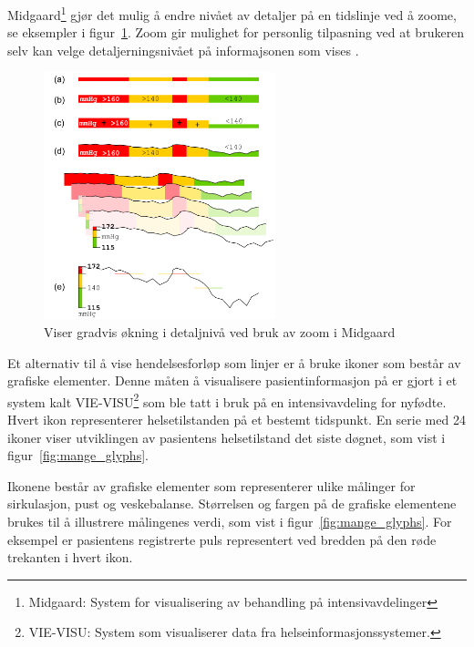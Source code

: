 Midgaard\footnote{Midgaard: System for visualisering av behandling på intensivavdelinger} gjør det mulig å endre nivået av detaljer på en tidslinje ved å zoome, se eksempler i figur~\ref{fig:midgaard}. Zoom gir mulighet for personlig tilpasning ved at brukeren selv kan velge detaljerningsnivået på informajsonen som vises \citep{rind2011interactive}. 

\begin{figure}[H]
  \centering
    \includegraphics[width=0.6\textwidth]{fig/litteratursok/midgaard.PNG}
  \caption{Viser gradvis økning i detaljnivå ved bruk av zoom i Midgaard \citep{rind2011interactive}}
\label{fig:midgaard}
\end{figure}

Et alternativ til å vise hendelsesforløp som linjer er å bruke ikoner som består av grafiske elementer. Denne måten å visualisere pasientinformasjon på er gjort i et system kalt VIE-VISU\footnote{VIE-VISU: System som visualiserer data fra helseinformasjonssystemer.} som ble tatt i bruk på en intensivavdeling for nyfødte. Hvert ikon representerer helsetilstanden på et bestemt tidspunkt. En serie med 24 ikoner viser utviklingen av pasientens helsetilstand det siste døgnet, som vist i figur~\ref{fig:mange_glyphs}. 

Ikonene består av grafiske elementer som representerer ulike målinger for sirkulasjon, pust og veskebalanse. Størrelsen og fargen på de grafiske elementene brukes til å illustrere målingenes verdi, som vist i figur~\ref{fig:mange_glyphs}. For eksempel er pasientens registrerte puls representert ved bredden på den røde trekanten i hvert ikon.


